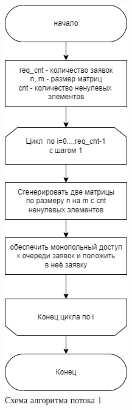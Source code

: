 \begin{figure}[h]
	\centering
	\includegraphics[height=0.85\textheight]{img/gen.png}
	\caption{Схема алгоритма потока 1}
	\label{fig:gen}
\end{figure}

